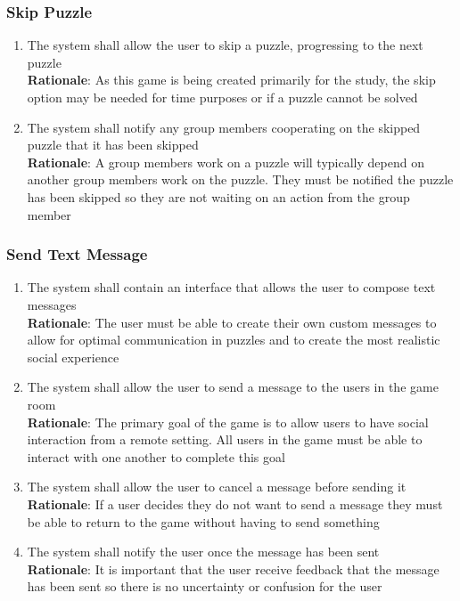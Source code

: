 \documentclass[12pt]{article}
\begin{document}
\subsubsection{Skip Puzzle}
    \begin{enumerate}[label=SP\arabic*., series=SkipPuzzle]
        \item The system shall allow the user to skip a puzzle, progressing to the next puzzle\\
        \textbf{Rationale}: As this game is being created primarily for the study, the skip option may be needed for time purposes or if a puzzle cannot be solved
        \item The system shall notify any group members cooperating on the skipped puzzle that it has been skipped\\
        \textbf{Rationale}: A group members work on a puzzle will typically depend on another group members work on the puzzle. They must be notified the puzzle has been skipped so they are not waiting on an action from the group member
    \end{enumerate}
\subsubsection{Send Text Message}
    \begin{enumerate}[label=SM\arabic*., series=SendMessage]
        \item The system shall contain an interface that allows the user to compose text messages\\
        \textbf{Rationale}: The user must be able to create their own custom messages to allow for optimal communication in puzzles and to create the most realistic social experience
        \item The system shall allow the user to send a message to the users in the game room\\
        \textbf{Rationale}: The primary goal of the game is to allow users to have social interaction from a remote setting. All users in the game must be able to interact with one another to complete this goal
        \item The system shall allow the user to cancel a message before sending it\\
        \textbf{Rationale}: If a user decides they do not want to send a message they must be able to return to the game without having to send something
        \item The system shall notify the user once the message has been sent\\
        \textbf{Rationale}: It is important that the user receive feedback that the message has been sent so there is no uncertainty or confusion for the user
    \end{enumerate}
\end{document}
